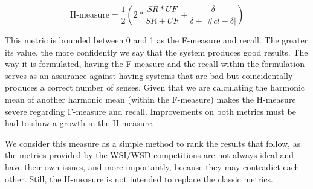 \begin{equation}
\text{H-measure} = \dfrac{1}{2}\left(2*\dfrac{SR*UF}{SR+UF}+\dfrac{\delta}{\delta+|\#cl-\delta|}\right)
\end{equation}

This metric is bounded between 0 and 1 as the F-measure and recall. The greater its value, the more confidently we  say that the system produces good results. The way it is formulated, having the F-measure and the recall within the formulation serves as an assurance against having systems that are bad but coincidentally produces a correct number of senses. Given that we are calculating the harmonic mean of another harmonic mean (within the F-measure) makes the H-measure severe regarding F-measure and recall. Improvements on both metrics must be had to show a growth in  the H-measure.

We consider this measure as a simple method to rank the results that follow, as the metrics provided by the WSI/WSD competitions are not always ideal and have their own issues, and more importantly, because they may contradict each other. Still, the H-measure is not intended to replace the classic metrics. 



